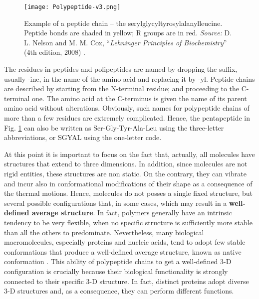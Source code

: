 \begin{figure}[h]
\centering
\begin{minipage}[t]{0.85\textwidth}
\centering
\texttt{[image: Polypeptide-v3.png]}

\caption{\small{Example of a peptide chain -- the serylglycyltyrosylalanylleucine. Peptide bonds are shaded in yellow; R groups are in red.
    \textit{Source:} D. L. Nelson and M. M. Cox, ``\textit{Lehninger Principles of Biochemistry}'' (4th edition, 2008) 
    \cite{nelson2008lehninger}.}
}

\label{fig:PentaPeptide}
\end{minipage} 
\end{figure}

The residues in peptides and polipeptides are named by dropping the suffix, usually -ine, in the name of the amino acid and replacing it by -yl. Peptide chains are described by starting from the N-terminal residue;  and proceeding to the C-terminal one. The amino acid at the C-terminus is given the name of its parent amino acid without alterations. Obviously, such names for polypeptide chains of more than a few residues are extremely complicated. Hence, the pentapeptide in Fig. \ref{fig:PentaPeptide} can also be written as Ser-Gly-Tyr-Ala-Leu using the three-letter abbreviations, or SGYAL using the one-letter code.

At this point it is important to focus on the fact that, actually, all molecules have structures that extend to three dimensions. In addition, since molecules are not rigid entities, these structures are non static. On the contrary, they can vibrate and incur also in conformational modifications of their shape as a consequence of the thermal motions. Hence, molecules do not posses a single fixed structure, but several possible configurations that, in some cases, which may result in a \textbf{well-defined average structure}.
In fact, polymers generally have an intrinsic tendency to be very flexible, when no specific structure is sufficiently more stable than all the others to predominate. Nevertheless, many biological macromolecules, especially proteins and nucleic acids, tend to adopt few stable conformations that produce a well-defined average structure, known as native conformation
\cite{nelson2008lehninger}. This ability of polypeptide chains to get a well-defined 3-D configuration is crucially because their biological functionality is strongly connected to their specific 3-D structure. In fact, distinct proteins adopt diverse 3-D structures and, as a consequence, they can perform different functions. 

